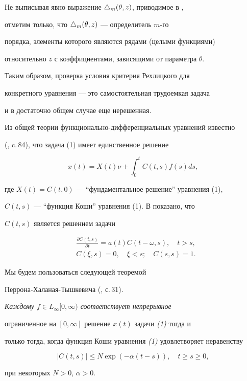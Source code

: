 Не выписывая явно выражение $\triangle_m(\theta,z)$, приводимое в \cite{Re},


отметим только, что $\triangle_m(\theta,z)$ --- определитель $m$-го


порядка, элементы которого являются рядами (целыми функциями)


относительно $z$ с коэффициентами, зависящими от параметра $\theta$.


Таким образом, проверка условия критерия Рехлицкого для


конкретного уравнения --- это самостоятельная трудоемкая задача


и в достаточно общем случае еще нерешенная.





Из общей теории функционально-дифференциальных уравнений известно


(\cite{Azb}, c.\,84), что задача (1) имеет единственное решение


$$


x(t)=X(t)\nu+\int_0^tC(t,s)f(s)ds,


$$


где $X(t)=C(t,0)$ --- ``фундаментальное решение'' уравнения (1),


$C(t,s)$ --- ``функция Коши'' уравнения (1). В \cite{Mak} показано, что


$C(t,s)$ является решением задачи


\begin{equation}


\begin{split}


&\frac{\partial C(t,s)}{\partial t}=a(t)C(t-\omega,s),\quad t>s,\\


&C(\xi,s)=0,\quad\xi<s;\quad C(s,s)=1.


\end{split}


\end{equation}





Мы будем пользоваться следующей теоремой


Перрона-Халаная-Тышкевича (\cite{Ty}, с.\,31).





{\it Каждому $f\in L_\infty[0,\infty)$ соответствует непрерывное


ограниченное на $[0,\infty]$ решение $x(t)$ задачи {\em (1)} тогда и


только тогда, когда функция Коши уравнения {\em (1)} удовлетворяет неравенству


\begin{equation}


|C(t,s)|\le N\exp(-\alpha(t-s)),\quad t\ge s\ge0,


\end{equation}


при некоторых $N>0$, $\alpha>0$.}





